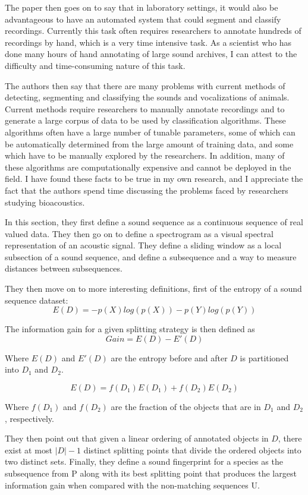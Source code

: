 \documentclass[12pt,oneside]{book}
\begin{document}
The paper then goes on to say that in laboratory settings, it would
also be advantageous to have an automated system that could segment
and classify recordings.  Currently this task often requires
researchers to annotate hundreds of recordings by hand, which is a
very time intensive task.  As a scientist who has done many hours of
hand annotating of large sound archives, I can attest to the
difficulty and time-consuming nature of this task.

The authors then say that there are many problems with current methods
of detecting, segmenting and classifying the sounds and vocalizations
of animals.  Current methods require researchers to manually annotate
recordings and to generate a large corpus of data to be used by
classification algorithms.  These algorithms often have a large number
of tunable parameters, some of which can be automatically determined
from the large amount of training data, and some which have to be
manually explored by the researchers.  In addition, many of these
algorithms are computationally expensive and cannot be deployed in the
field.  I have found these facts to be true in my own research, and I
appreciate the fact that the authors spend time discussing the
problems faced by researchers studying bioacoustics.

In this section, they first define a sound sequence as a continuous
sequence of real valued data.  They then go on to define a spectrogram
as a visual spectral representation of an acoustic signal.  They
define a sliding window as a local subsection of a sound sequence, and
define a subsequence and a way to measure distances between
subsequences.

They then move on to more interesting definitions, first of the
entropy of a sound sequence dataset:
	\[ E(D) = -p(X)log(p(X)) - p(Y)log(p(Y)) \]

The information gain for a given splitting strategy is then defined as
	\[ Gain = E(D) - E'(D) \]

Where $E(D)$ and $E'(D)$ are the entropy before and after $D$ is
partitioned into $D_1$ and $D_2$.

	\[ E(D) = f(D_1)E(D_1) + f(D_2)E(D_2) \] 

Where $f(D_1)$ and $f(D_2)$ are the fraction of the objects that are
in $D_1$ and $D_2$, respectively.

They then point out that given a linear ordering of annotated objects
in $D$, there exist at most $|D|-1$ distinct splitting points that
divide the ordered objects into two distinct sets.  Finally, they
define a sound fingerprint for a species as the subsequence from P
along with its best splitting point that produces the largest
information gain when compared with the non-matching sequences U.
\end{document}
